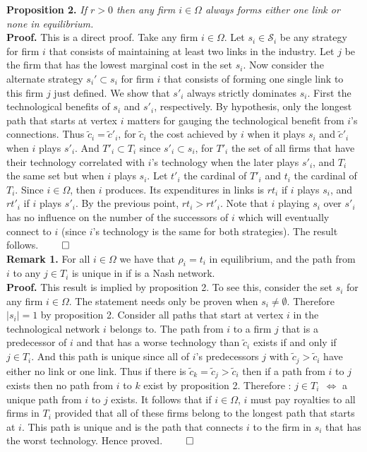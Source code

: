 \documentclass{article}
\begin{document}
\textbf{Proposition 2.} \textit{If $r>0$ then any firm $i\in \Omega$ always forms either one link or none in equilibrium. }\\

\indent \textbf{Proof.} This is a direct proof. Take any firm $i\in \Omega$. Let $s_i\in \mathcal{S}_i$ be any strategy for firm $i$ that consists of maintaining at least two links in the industry. Let $j$ be the firm that has the lowest marginal cost in the set $s_i$. Now consider the alternate strategy $s_i'\subset s_i$  for firm $i$ that consists of forming one single link to this firm $j$ just defined. We show that $s'_i$ always strictly dominates $s_i$. First the technological benefits of $s_i$ and $s'_i$, respectively. By hypothesis, only the longest path that starts at vertex $i$ matters for gauging the technological benefit from $i$'s connections. Thus $\tilde{c}_i=\tilde{c}'_i$, for $\tilde{c}_i$ the cost achieved by $i$ when it plays $s_i$ and $\tilde{c}'_i$ when $i$ plays $s'_i$. And $T'_i\subset T_i$ since $s'_i\subset s_i$, for $T'_i$ the set of all firms that have their technology correlated with $i$'s technology when the later plays $s'_i$, and $T_i$ the same set but when $i$ plays $s_i$. Let $t'_i$ the cardinal of $T'_i$ and $t_i$ the cardinal of $T_i$. Since $i\in \Omega$, then $i$ produces. Its expenditures in links is $rt_i$ if $i$ plays $s_i$, and $rt'_i$ if $i$ plays $s'_i$. By the previous point, $rt_i>rt'_i$. Note that $i$ playing $s_i$ over $s'_i$ has no influence on the number of the successors of $i$ which will eventually connect to $i$ (since $i$'s technology is the same for both strategies). The result follows. $ \qed$\\  

\textbf{Remark 1.} For all $i\in \Omega$ we have that $\rho_i=t_i$ in equilibrium, and the path from $i$ to any $j\in T_i$ is unique in  if  is a Nash network. \\

\indent \textbf{Proof.} This result is implied by proposition 2. To see this, consider the set $s_i$ for any firm $i\in \Omega$. The statement needs only be proven when $s_i\neq \emptyset$. Therefore $|s_i|=1$ by proposition 2. Consider all paths that start at vertex $i$ in the technological network $i$ belongs to. The path from $i$ to a firm $j$ that is a predecessor of $i$ and that has a worse technology than $\tilde{c}_i$ exists if and only if $j\in T_i$. And this path is unique since all of $i$'s predecessors $j$ with $\tilde{c}_j>\tilde{c}_i$ have either no link or one link. Thus if there is $\tilde{c}_k=\tilde{c}_j>\tilde{c}_i$ then if a path from $i$ to $j$ exists then no path from $i$ to $k$ exist by proposition 2. Therefore : $j\in T_i~~\Leftrightarrow$ a unique path from $i$ to $j$ exists. It follows that if $i\in \Omega$, $i$ must pay royalties to all firms in $T_i$ provided that all of these firms belong to the longest path that starts at $i$. This path is unique and is the path that connects $i$ to the firm in $s_i$ that has the worst technology. Hence proved. $\qed$\\
\end{document}

